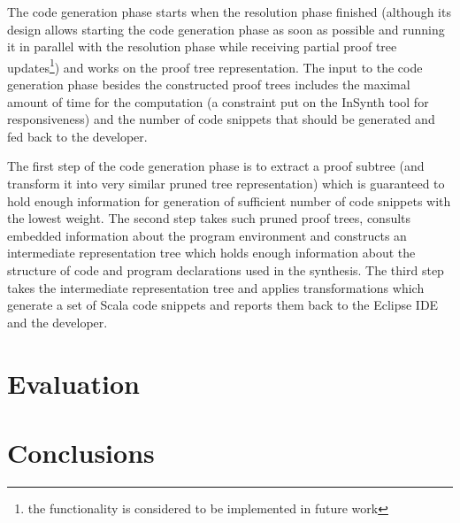 \documentclass[preprint, nocopyrightspace]{sigplanconf}
\begin{document}
The code generation phase starts when the resolution phase finished (although its design allows starting the code generation phase as soon as possible and running it in parallel with the resolution phase while receiving partial proof tree updates\footnote{the functionality is considered to be implemented in future work}) and works on the proof tree representation.
The input to the code generation phase besides the constructed proof trees includes the maximal amount of time for the computation (a constraint put on the InSynth tool for responsiveness) and the number of code snippets that should be generated and fed back to the developer.

The first step of the code generation phase is to extract a proof subtree (and transform it into very similar pruned tree representation) which is guaranteed to hold enough information for generation of sufficient number of code snippets with the lowest weight.
The second step takes such pruned proof trees, consults embedded information about the program environment and constructs an intermediate representation tree which holds enough information about the structure of code and program declarations used in the synthesis.
The third step takes the intermediate representation tree and applies transformations which generate a set of Scala code snippets and reports them back to the Eclipse IDE and the developer.



\section{Evaluation}
\label{sec:evaluation}


\section{Conclusions}
\label{sec:conclusions}





\end{document}
